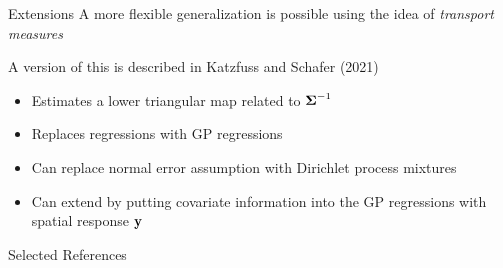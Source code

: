 \documentclass[letterpaper, 10pt, compress]{beamer}
\begin{document}
\begin{frame}{Extensions}
    A more flexible generalization is possible using the idea of \emph{transport measures}
    \medskip\par

    A version of this is described in Katzfuss and Schafer (2021)
    \cite{katzfuss-schafer-2021-tm}
    \begin{itemize}
        \item Estimates a lower triangular map related to $\boldsymbol{\Sigma}^{-1}$
        \item Replaces regressions with GP regressions
        \item Can replace normal error assumption with Dirichlet process mixtures
        \item Can extend by putting covariate information into the GP regressions
        with spatial response $\mathbf{y}$
    \end{itemize}
\end{frame}

\begin{frame}{Selected References}
    \footnotesize
    \printbibliography
\end{frame}
\end{document}
